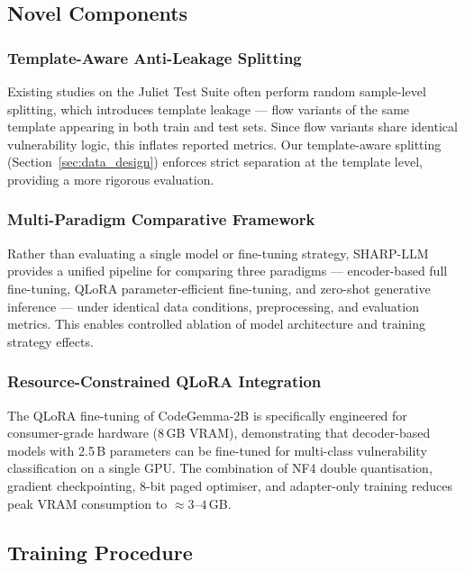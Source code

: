 \documentclass[conference]{IEEEtran}
\begin{document}
\subsection{Novel Components}
\label{sec:novel}

\subsubsection{Template-Aware Anti-Leakage Splitting}
Existing studies on the Juliet Test Suite often perform random sample-level
splitting, which introduces template leakage --- flow variants of the same
template appearing in both train and test sets.  Since flow variants share
identical vulnerability logic, this inflates reported metrics.  Our
template-aware splitting (Section~\ref{sec:data_design}) enforces strict
separation at the template level, providing a more rigorous evaluation.

\subsubsection{Multi-Paradigm Comparative Framework}
Rather than evaluating a single model or fine-tuning strategy, SHARP-LLM
provides a unified pipeline for comparing three paradigms ---
encoder-based full fine-tuning, QLoRA parameter-efficient fine-tuning, and
zero-shot generative inference --- under identical data conditions,
preprocessing, and evaluation metrics.  This enables controlled ablation
of model architecture and training strategy effects.

\subsubsection{Resource-Constrained QLoRA Integration}
The QLoRA fine-tuning of CodeGemma-2B is specifically engineered for
consumer-grade hardware (8\,GB VRAM), demonstrating that decoder-based
models with 2.5\,B parameters can be fine-tuned for multi-class
vulnerability classification on a single GPU.  The combination of NF4
double quantisation, gradient checkpointing, 8-bit paged optimiser, and
adapter-only training reduces peak VRAM consumption to
$\approx\!3$--$4$\,GB.

\subsection{Training Procedure}
\label{sec:training}
\end{document}
